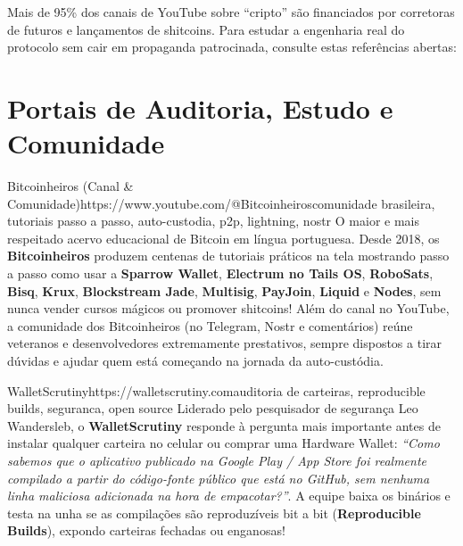 \documentclass{pousadaguide}
\begin{document}
Mais de 95\% dos canais de YouTube sobre ``cripto'' são financiados por corretoras de futuros e lançamentos de shitcoins. Para estudar a engenharia real do protocolo sem cair em propaganda patrocinada, consulte estas referências abertas:

\section{Portais de Auditoria, Estudo e Comunidade}

\begin{ferramenta}[goat,logo=bitcoinheiros]{Bitcoinheiros (Canal \& Comunidade)}{https://www.youtube.com/@Bitcoinheiros}{comunidade brasileira, tutoriais passo a passo, auto-custodia, p2p, lightning, nostr}
O maior e mais respeitado acervo educacional de Bitcoin em língua portuguesa. Desde 2018, os \textbf{Bitcoinheiros} produzem centenas de tutoriais práticos na tela mostrando passo a passo como usar a \textbf{Sparrow Wallet}, \textbf{Electrum no Tails OS}, \textbf{RoboSats}, \textbf{Bisq}, \textbf{Krux}, \textbf{Blockstream Jade}, \textbf{Multisig}, \textbf{PayJoin}, \textbf{Liquid} e \textbf{Nodes}, sem nunca vender cursos mágicos ou promover shitcoins! Além do canal no YouTube, a comunidade dos Bitcoinheiros (no Telegram, Nostr e comentários) reúne veteranos e desenvolvedores extremamente prestativos, sempre dispostos a tirar dúvidas e ajudar quem está começando na jornada da auto-custódia. 
\end{ferramenta}

\begin{ferramenta}[goat,logo=walletscrutiny]{WalletScrutiny}{https://walletscrutiny.com}{auditoria de carteiras, reproducible builds, seguranca, open source}
Liderado pelo pesquisador de segurança Leo Wandersleb, o \textbf{WalletScrutiny} responde à pergunta mais importante antes de instalar qualquer carteira no celular ou comprar uma Hardware Wallet: \emph{``Como sabemos que o aplicativo publicado na Google Play / App Store foi realmente compilado a partir do código-fonte público que está no GitHub, sem nenhuma linha maliciosa adicionada na hora de empacotar?''}. A equipe baixa os binários e testa na unha se as compilações são reproduzíveis bit a bit (\textbf{Reproducible Builds}), expondo carteiras fechadas ou enganosas! 
\end{ferramenta}
\end{document}

